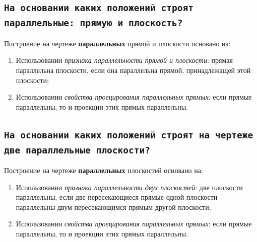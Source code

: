 
\newpage
\subsection{\texttt{На основании каких положений строят параллельные: прямую и плоскость?}}

\begin{myquote}
    
\end{myquote}

Построение на чертеже {\bf параллельных} прямой и плоскости основано на:

\begin{enumerate}
    \item Использовании \textit {признака параллельности прямой и плоскости}: прямая параллельна плоскости, если она параллельна прямой, принадлежащей этой плоскости;
    \item Использовании \textit {свойства проецирования параллельных прямых}: если прямые параллельны, то и проекции этих прямых параллельны.
\end{enumerate}




\newpage
\subsection{\texttt{На основании каких положений строят на чертеже две параллельные плоскости?}}

\begin{myquote}
    
\end{myquote}

Построение на чертеже {\bf параллельных} плоскостей основано на:

\begin{enumerate}
    \item Использовании \textit {признака параллельности двух плоскостей}: две плоскости параллельны, если две пересекающиеся прямые одной плоскости параллельны двум пересекающимся прямым другой плоскости;
    \item Использовании \textit {свойства проецирования параллельных прямых}: если прямые параллельны, то и проекции этих прямых параллельны.
\end{enumerate}

